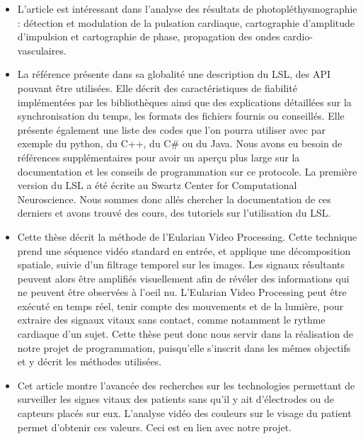 \documentclass[12 pt]{article}
\begin{document}
\begin{itemize}
\newline
\item L'article \cite{Verkr} est intéressant dans l'analyse des résultats de photopléthysmographie : détection et modulation de la pulsation cardiaque, cartographie d'amplitude d'impulsion et cartographie de phase, propagation des ondes cardio-vasculaires.
\newline
\item La référence \cite{Sch} présente dans sa globalité une description du LSL, des API pouvant être utilisées. Elle décrit des caractéristiques de fiabilité implémentées par les bibliothèques ainsi que des explications détaillées sur la synchronisation du temps, les formats des fichiers fournis ou conseillés. Elle présente également une liste des codes que l'on pourra utiliser avec par exemple du python, du C++, du C\# ou du Java. 
Nous avons eu besoin de références supplémentaires pour avoir un aperçu plus large sur la documentation et les conseils de programmation sur ce protocole. La première version du LSL a été écrite au Swartz Center for Computational Neuroscience. Nous sommes donc allés chercher la documentation de ces derniers et avons trouvé des cours, des tutoriels sur l'utilisation du LSL. 
\newpage
\item Cette thèse \cite{Wu} décrit la méthode de l'Eularian Video Processing. Cette technique prend une séquence vidéo standard en entrée, et applique une décomposition spatiale, suivie d'un filtrage temporel sur les images. Les signaux résultants peuvent alors être amplifiés visuellement afin de révéler des informations qui ne peuvent être observées à l'oeil nu.
L'Eularian Video Processing peut être exécuté en temps réel, tenir compte des mouvements et de la lumière, pour extraire des signaux vitaux sans contact, comme notamment le rythme cardiaque d'un sujet.
Cette thèse peut donc nous servir dans la réalisation de notre projet de programmation, puisqu'elle s'inscrit dans les mêmes objectifs et y décrit les méthodes utilisées.
\newline
\item Cet article \cite{Tara} montre l'avancée des recherches sur les technologies permettant de surveiller les signes vitaux des patients sans qu'il y ait d'électrodes ou de capteurs placés sur eux. 
L'analyse vidéo des couleurs sur le visage du patient permet d'obtenir ces valeurs. Ceci est en lien avec notre projet.
\end{itemize}


\end{document}
